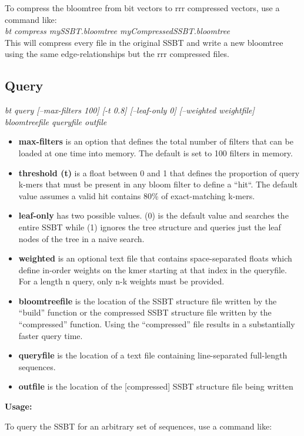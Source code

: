\documentclass{article}
\begin{document}
To compress the bloomtree from bit vectors to rrr compressed vectors, use a command like: \\

\textit{bt compress mySSBT.bloomtree myCompressedSSBT.bloomtree} \\

This will compress every file in the original SSBT and write a new bloomtree using the same edge-relationships but the rrr compressed files.


\subsection{Query}
\textit{bt query [--max-filters 100] [-t 0.8] [--leaf-only 0] [--weighted weightfile] bloomtreefile queryfile outfile}
\begin{itemize}
\item \textbf{max-filters} is an option that defines the total number of filters that can be loaded at one time into memory. The default is set to 100 filters in memory. 
\item \textbf{threshold (t)} is a float between 0 and 1 that defines the proportion of query k-mers that must be present in any bloom filter to define a ``hit``. The default value assumes a valid hit contains 80\% of exact-matching k-mers.
\item \textbf{leaf-only} has two possible values. (0) is the default value and searches the entire SSBT while (1) ignores the tree structure and queries just the leaf nodes of the tree in a naive search.
\item \textbf{weighted} is an optional text file that contains space-separated floats which define in-order weights on the kmer starting at that index in the queryfile. For a length n query, only n-k weights must be provided.
\item \textbf{bloomtreefile} is the location of the SSBT structure file written by the ``build'' function or the compressed SSBT structure file written by the ``compressed'' function. Using the ``compressed'' file results in a substantially faster query time.
\item \textbf{queryfile} is the location of a text file containing line-separated full-length sequences.
\item \textbf{outfile} is the location of the [compressed] SSBT structure file being written
\end{itemize}
\textbf{Usage:}

To query the SSBT for an arbitrary set of sequences, use a command like: \\
\end{document}

